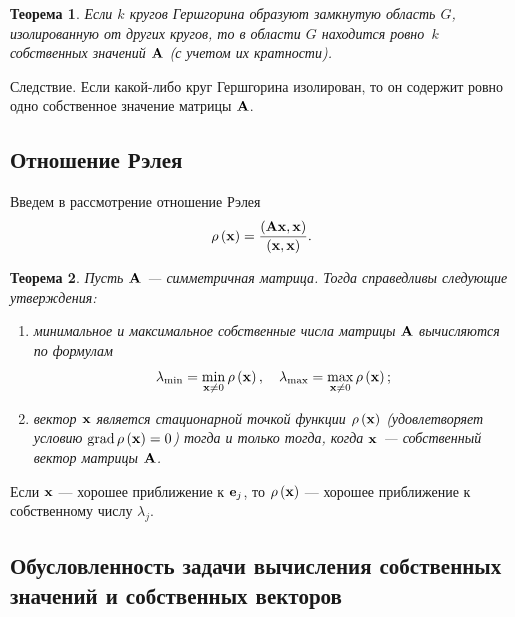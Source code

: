 \documentclass[12pt]{article}
\newtheorem{theorem}{Теорема}
\DeclareMathOperator{\grad}{grad}
\begin{document}
	\begin{theorem}
		Если $k$ кругов Гершгорина образуют замкнутую область $G$, изолированную от других кругов, то в области $G$ находится ровно~$k$ собственных значений $\bold{A}$ (с учетом их кратности).
	\end{theorem}
	
	Следствие. Если какой-либо круг Гершгорина изолирован, то он содержит ровно одно собственное значение матрицы $\bold{A}$.
	
	\subsection*{Отношение Рэлея}
	Введем в рассмотрение отношение Рэлея 
	\begin{equation}
		\rho\left(\bold{x}\right)=\frac{\left(\bold{Ax},\bold{x}\right)}{\left(\bold{x},\bold{x}\right)}.\label{fm56}
	\end{equation}
	\begin{theorem}
		Пусть $\bold{A}$ --- симметричная матрица. Тогда справедливы следующие утверждения:
		\begin{enumerate}
			\item минимальное и максимальное собственные числа матрицы $\bold{A}$ вычисляются по формулам
			\begin{equation}
				\lambda_{\min}=\min_{\bold{x}\neq 0}\rho\left(\bold{x}\right),\quad \lambda_{\max}=\max_{\bold{x}\neq 0}\rho\left(\bold{x}\right);
			\end{equation}
			\item вектор $\bold{x}$ является стационарной точкой функции $\rho\left(\bold{x}\right)$ (удовлетворяет условию $\grad\rho\left(\bold{x}\right)=0$) тогда и только тогда, когда $\bold{x}$ --- собственный вектор матрицы $\bold{A}$.
		\end{enumerate}
	\end{theorem}
	
	Если $\bold{x}$ --- хорошее приближение к $\bold{e}_j$, то $\rho\left(\bold{x}\right)$ --- хорошее приближение к собственному числу $\lambda_j$.
	
	\subsection*{Обусловленность задачи вычисления собственных значений и собственных векторов}
	
\end{document}
